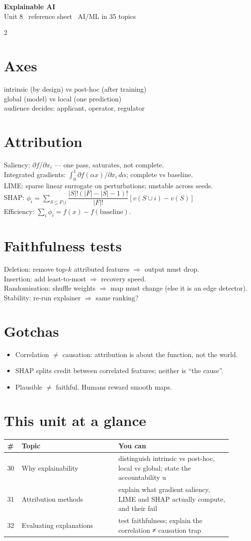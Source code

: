 \documentclass[11pt,a4paper]{article}
\newcommand{\sect}[1]{\section*{#1}}
\newcommand{\hd}[2]{\begin{center}{\large\bfseries #1}\\[-0.1em]{\small\color{gray}#2}\end{center}\vspace{-0.6em}}
\begin{document}
\hd{Explainable AI}{Unit 8 \textperiodcentered\ reference sheet \textperiodcentered\ AI/ML in 35 topics}
\begin{multicols}{2}
\normalsize

\sect{Axes}
intrinsic (by design) vs post-hoc (after training)\\
global (model) vs local (one prediction)\\
audience decides: applicant, operator, regulator

\sect{Attribution}
Saliency: $\partial f/\partial x_i$ --- one pass, saturates, not complete.\\
Integrated gradients: $\int_0^1 \partial f(\alpha x)/\partial x_i\,d\alpha$; complete vs baseline.\\
LIME: sparse linear surrogate on perturbations; unstable across seeds.\\
SHAP: $\phi_i=\sum_{S\subseteq F\setminus i}\dfrac{|S|!(|F|-|S|-1)!}{|F|!}[v(S\cup i)-v(S)]$\\
Efficiency: $\sum_i\phi_i=f(x)-f(\text{baseline})$.

\sect{Faithfulness tests}
Deletion: remove top-$k$ attributed features $\Rightarrow$ output must drop.\\
Insertion: add least-to-most $\Rightarrow$ recovery speed.\\
Randomisation: shuffle weights $\Rightarrow$ map must change (else it is an edge detector).\\
Stability: re-run explainer $\Rightarrow$ same ranking?

\sect{Gotchas}
\begin{itemize}
\item Correlation $\neq$ causation: attribution is about the function, not the world.
\item SHAP splits credit between correlated features; neither is ``the cause''.
\item Plausible $\neq$ faithful. Humans reward smooth maps.
\end{itemize}

\sect{This unit at a glance}
\begin{tabular}{@{}p{0.05\linewidth}p{0.40\linewidth}p{0.47\linewidth}@{}}
\toprule
\# & Topic & You can\\
\midrule
30 & Why explainability & distinguish intrinsic vs post-hoc, local vs global; state the accountability u\\
31 & Attribution methods & explain what gradient saliency, LIME and SHAP actually compute, and their fail\\
32 & Evaluating explanations & test faithfulness; explain the correlation ≠ causation trap\\
\bottomrule
\end{tabular}


\end{multicols}
\end{document}
